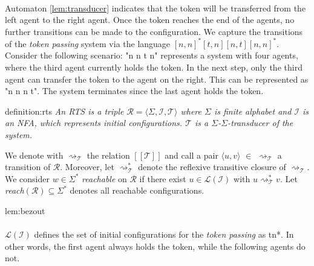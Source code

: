 \paragraph*{}
Automaton \ref{lem:transducer} indicates that the token will be transferred from the left agent to the right agent. 
Once the token reaches the end of the agents, no further transitions can be made to the configuration.
We capture the transitions of the \textit{token passing} system via the language 
$[n,n]^*[t,n][n,t][n,n]^*$.
Consider the following scenario: "n n t n" represents a system with four agents, 
where the third agent currently holds the token. In the next step, 
only the third agent can transfer the token to the agent on the right. 
This can be represented as "n n n t". The system terminates since the last agent 
holds the token.

\begin{theo}{definition:rts}
    \textit{
    An RTS is a triple $\mathcal{R} = \langle \Sigma, \mathcal{I}, \mathcal{T} \rangle$ where $\Sigma$
    is finite alphabet and $\mathcal{I}$ is an NFA, which represents initial configurations.
    $\mathcal{T}$ is a $\Sigma$-$\Sigma$-\textit{transducer} of the system.
    }
\end{theo}

We denote with $\rightsquigarrow_\mathcal{T}$ the relation $[[\mathcal{T}]]$ and call
a pair $\langle u, v \rangle$ $\in$ $\rightsquigarrow_\mathcal{T}$ a transition of $\mathcal{R}$.
Moreover, let $\rightsquigarrow_\mathcal{T}^{*}$ denote the reflexive
transitive closure of $\rightsquigarrow_\mathcal{T}$.
We consider $w \in \Sigma^*$ \textit{reachable} on $\mathcal{R}$
if there exist $u \in \mathcal{L}(\mathcal{I})$ with $u \rightsquigarrow_\mathcal{T}^{*} v$.
Let \textit{reach}$(\mathcal{R}) \subseteq \Sigma^*$ denotes all
reachable configurations.
\begin{lem}{lem:bezout}
\end{lem}

\paragraph*{}
$\mathcal{L}(\mathcal{I})$ defines the set of initial configurations for the \textit{token passing} 
as tn*.
In other words, the first agent always holds the token, while the following agents do not.

